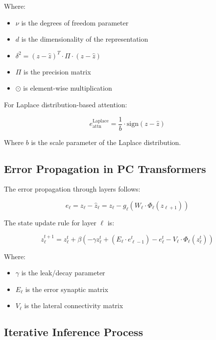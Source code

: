 \documentclass{article}
\begin{document}
Where:
\begin{itemize}
  \item $\nu$ is the degrees of freedom parameter
  \item $d$ is the dimensionality of the representation
  \item $\delta^2 = (z - \hat{z})^T \cdot \Pi \cdot (z - \hat{z})$
  \item $\Pi$ is the precision matrix
  \item $\odot$ is element-wise multiplication
\end{itemize}

For Laplace distribution-based attention:

\begin{equation}
  e_{\text{attn}}^{\text{Laplace}} = \frac{1}{b} \cdot \text{sign}(z - \hat{z})
\end{equation}

Where $b$ is the scale parameter of the Laplace distribution.

\subsection{Error Propagation in PC Transformers}

The error propagation through layers follows:

\begin{equation}
  e_\ell = z_\ell - \hat{z}_\ell = z_\ell - g_\ell(W_\ell \cdot \Phi_\ell(z_{\ell+1}))
\end{equation}

The state update rule for layer $\ell$ is:

\begin{equation}
  z_\ell^{t+1} = z_\ell^t + \beta \left( -\gamma z_\ell^t + (E_\ell \cdot e_{\ell-1}^t) - e_\ell^t - V_\ell \cdot \Phi_\ell(z_\ell^t) \right)
\end{equation}

Where:
\begin{itemize}
  \item $\gamma$ is the leak/decay parameter
  \item $E_\ell$ is the error synaptic matrix
  \item $V_\ell$ is the lateral connectivity matrix
\end{itemize}

\subsection{Iterative Inference Process}
\end{document}
